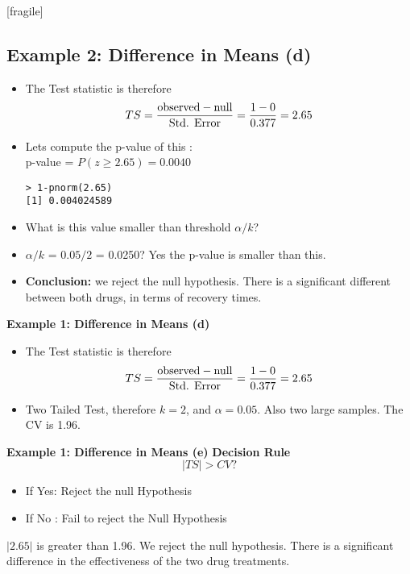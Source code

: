 \documentclass[a4paper,12pt]{article}
\begin{document}
[fragile]
\subsection*{Example 2: Difference in Means (d) }
\begin{itemize}
\item The Test statistic is therefore
\[ TS = {\mbox{observed} - \mbox{null} \over \mbox{Std. Error}}  = {1 - 0 \over 0.377 } = 2.65 \]
\item Lets compute the p-value of this : \\
p-value = $P(z \geq 2.65) = 0.0040$
\begin{verbatim}
> 1-pnorm(2.65)
[1] 0.004024589
\end{verbatim}

\item What is this value smaller than threshold $\alpha / k$? \\
\item $\alpha / k$ = $0.05/2$ = 0.0250? Yes the p-value is smaller than this.
\item \textbf{Conclusion:} we reject the null hypothesis. There is a significant different between both drugs, in terms of recovery times.

\end{itemize}




\noindent \textbf{Example 1: Difference in Means (d) }
\begin{itemize}
\item The Test statistic is therefore
\[ TS = {\mbox{observed} - \mbox{null} \over \mbox{Std. Error}}  = {1 - 0 \over 0.377 } = 2.65 \]
\item Two Tailed Test, therefore $k = 2$, and $\alpha = 0.05$. Also two large samples. The CV is 1.96.
\end{itemize}




\noindent \textbf{Example 1: Difference in Means (e) }
\textbf{Decision Rule}
\[ |TS| > CV ?  \]
\begin{itemize}
\item If Yes: Reject the null Hypothesis
\item If No : Fail to reject the Null Hypothesis
\end{itemize}
$|2.65|$ is greater than 1.96. We reject the null hypothesis. There is a significant difference in the effectiveness of the two drug treatments.
\end{document}
